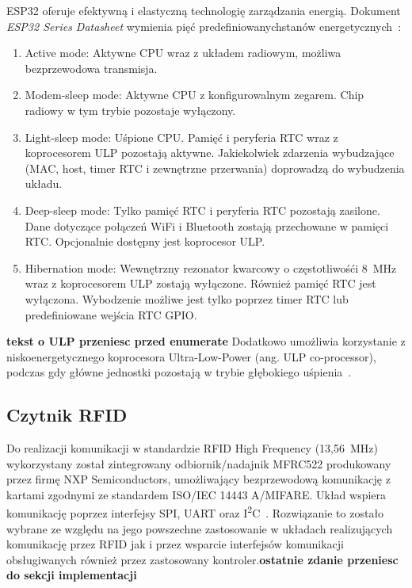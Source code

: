         ESP32 oferuje efektywną i elastyczną technologię zarządzania energią. Dokument \textit{ESP32 Series Datasheet} wymienia pięć predefiniowanychstanów energetycznych~\cite{esp32-ds}:
        \begin{enumerate}
            \item Active mode: Aktywne CPU wraz z układem radiowym, możliwa bezprzewodowa transmisja.
            \item Modem-sleep mode: Aktywne CPU z konfigurowalnym zegarem. Chip radiowy w tym trybie pozostaje wyłączony.
            \item Light-sleep mode: Uśpione CPU. Pamięć i peryferia RTC wraz z koprocesorem ULP pozostają aktywne. Jakiekolwiek zdarzenia wybudzające (MAC, host, timer RTC i zewnętrzne przerwania) doprowadzą do wybudzenia układu.
            \item Deep-sleep mode: Tylko pamięć RTC i peryferia RTC pozostają zasilone. Dane dotyczące połączeń WiFi i Bluetooth zostają przechowane w pamięci RTC. Opcjonalnie dostępny jest koprocesor ULP.
            \item Hibernation mode: Wewnętrzny rezonator kwarcowy o częstotliwośći 8~MHz wraz z koprocesorem ULP zostają wyłączone. Również pamięć RTC jest wyłączona. Wybodzenie możliwe jest tylko poprzez timer RTC lub predefiniowane wejścia RTC GPIO.
        \end{enumerate}
        \textbf{tekst o ULP przeniesc przed enumerate}
        Dodatkowo umożliwia korzystanie z niskoenergetycznego koprocesora Ultra-Low-Power (ang. ULP co-processor), podczas gdy główne jednostki pozostają w trybie głębokiego uśpienia~\cite{esp32-tech-ref-man}.

    \subsection{Czytnik RFID}

        Do realizacji komunikacji w standardzie RFID High Frequency (13,56~MHz) wykorzystany został zintegrowany odbiornik/nadajnik MFRC522 produkowany przez firmę NXP Semiconductors, umożliwający bezprzewodową komunikację z kartami zgodnymi ze standardem ISO/IEC 14443 A/MIFARE. Układ wspiera komunikację poprzez interfejsy SPI, UART oraz I\textsuperscript{2}C~\cite{mfrc522-ds}. Rozwiązanie to zostało wybrane ze względu na jego powszechne zastosowanie w układach realizujących komunikację przez RFID jak i przez wsparcie interfejsów komunikacji obsługiwanych również przez zastosowany kontroler.\textbf{ostatnie zdanie przeniesc do sekcji implementacji}

